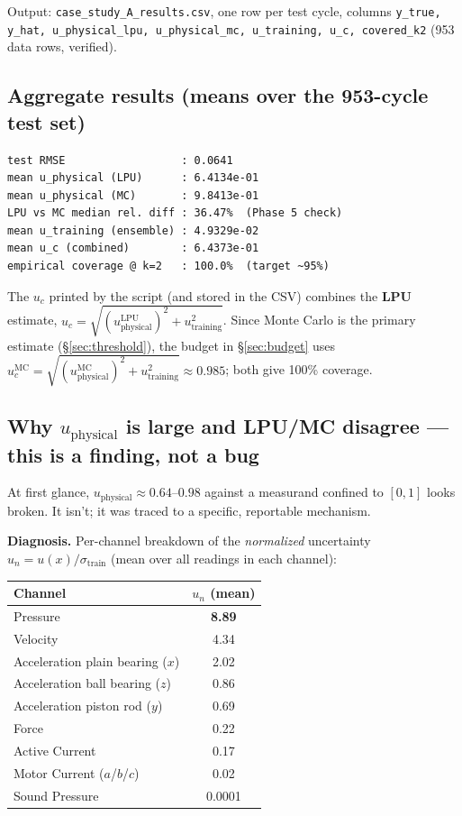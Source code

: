 \documentclass[11pt]{article}
\begin{document}
Output: \texttt{case\_\allowbreak study\_\allowbreak A\_\allowbreak results.csv}, one row per test cycle,
columns \texttt{y\_true, y\_hat, u\_\allowbreak physical\_\allowbreak lpu, u\_\allowbreak physical\_\allowbreak mc, u\_\allowbreak training, u\_c,
covered\_k2} (953 data rows, verified).

\subsection*{Aggregate results (means over the 953-cycle test set)}

\begin{verbatim}
test RMSE                  : 0.0641
mean u_physical (LPU)      : 6.4134e-01
mean u_physical (MC)       : 9.8413e-01
LPU vs MC median rel. diff : 36.47%  (Phase 5 check)
mean u_training (ensemble) : 4.9329e-02
mean u_c (combined)        : 6.4373e-01
empirical coverage @ k=2   : 100.0%  (target ~95%)
\end{verbatim}

The $u_c$ printed by the script (and stored in the CSV) combines the \textbf{LPU} estimate,
$u_c=\sqrt{(u_{\mathrm{physical}}^{\mathrm{LPU}})^2+u_{\mathrm{training}}^2}$. Since Monte Carlo is the primary
estimate (\S\ref{sec:threshold}), the budget in \S\ref{sec:budget} uses
$u_c^{\mathrm{MC}}=\sqrt{(u_{\mathrm{physical}}^{\mathrm{MC}})^2+u_{\mathrm{training}}^2}\approx 0.985$; both give 100\% coverage.

\subsection*{Why $u_{\mathrm{physical}}$ is large and LPU/MC disagree --- this is a finding,
not a bug}

At first glance, $u_{\mathrm{physical}} \approx 0.64$--$0.98$ against a measurand confined to
$[0,1]$ looks broken. It isn't; it was traced to a specific, reportable
mechanism.

\textbf{Diagnosis.} Per-channel breakdown of the \emph{normalized}
uncertainty $u_n = u(x)/\sigma_{\text{train}}$ (mean over all readings in
each channel):

\begin{center}
\begin{tabular}{@{}lc@{}}
\toprule
Channel & $u_n$ (mean) \\
\midrule
Pressure & \textbf{8.89} \\
Velocity & 4.34 \\
Acceleration plain bearing ($x$) & 2.02 \\
Acceleration ball bearing ($z$) & 0.86 \\
Acceleration piston rod ($y$) & 0.69 \\
Force & 0.22 \\
Active Current & 0.17 \\
Motor Current ($a$/$b$/$c$) & 0.02 \\
Sound Pressure & 0.0001 \\
\bottomrule
\end{tabular}
\end{center}
\end{document}
